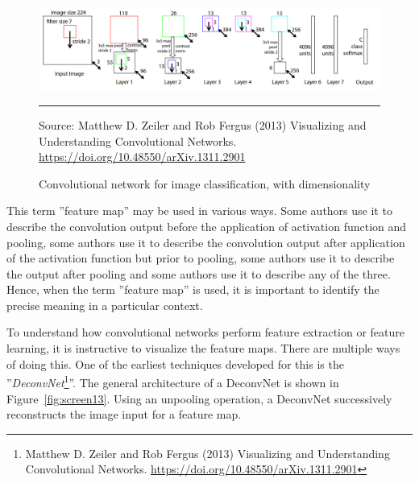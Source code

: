 \begin{figure}
\centering
\includegraphics[width=\textwidth]{screen12.png}  \\
\vspace{\baselineskip}

\hrule

\vspace{\baselineskip}
\scriptsize Source: Matthew D. Zeiler and Rob Fergus (2013) Visualizing and Understanding Convolutional Networks. \url{https://doi.org/10.48550/arXiv.1311.2901}

\caption{Convolutional network for image classification, with dimensionality}
\label{fig:screen12}
\end{figure}


\begin{tcolorbox}[colback=alert]
This term ''feature map'' may be used in various ways. Some authors use it to describe the convolution output before the application of activation function and pooling, some authors use it to describe the convolution output after application of the activation function but prior to pooling, some authors use it to describe the output after pooling and some authors use it to describe any of the three. Hence, when the term ''feature map'' is used, it is important to identify the precise meaning in a particular context.
\end{tcolorbox}

To understand how convolutional networks perform feature extraction or feature learning, it is instructive to visualize the feature maps. There are multiple ways of doing this. One of the earliest techniques developed for this is the ''\emph{DeconvNet}\footnote{Matthew D. Zeiler and Rob Fergus (2013) Visualizing and Understanding Convolutional Networks. \url{https://doi.org/10.48550/arXiv.1311.2901}}''. The general architecture of a DeconvNet is shown in Figure~\ref{fig:screen13}. Using an unpooling operation, a DeconvNet successively reconstructs the image input for a feature map. 

